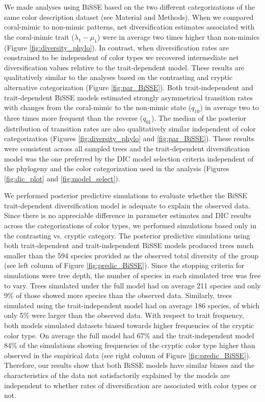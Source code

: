 We made analyses using BiSSE based on the two different categorizations of the same color description dataset (see Material and Methods). When we compared coral-mimic to non-mimic patterns, net diversification estimates associated with the coral-mimic trait ($\lambda_{1} - \mu_{1}$) were in average two times higher than non-mimics (Figure \ref{fig:diversity_phylo}). In contrast, when diversification rates are constrained to be independent of color types we recovered intermediate net diversification values relative to the trait-dependent model. These results are qualitatively similar to the analyses based on the contrasting and cryptic alternative categorization (Figure \ref{fig:par_BiSSE}). Both trait-independent and trait-dependent BiSSE models estimated strongly asymmetrical transition rates with changes from the coral-mimic to the non-mimic state ($q_{10}$) in average two to three times more frequent than the reverse ($q_{01}$). The median of the posterior distribution of transition rates are also qualitatively similar independent of color categorization (Figures \ref{fig:diversity_phylo} and \ref{fig:par_BiSSE}). These results were consistent across all sampled trees and the trait-dependent diversification model was the one preferred by the DIC model selection criteria independent of the phylogeny and the color categorization used in the analysis (Figures \ref{fig:dic_plot} and \ref{fig:model_select}).

We performed posterior predictive simulations to evaluate whether the BiSSE trait-dependent diversification model is adequate to explain the observed data. Since there is no appreciable difference in parameter estimates and DIC results across the categorizations of color types, we performed simulations based only in the contrasting vs. cryptic category. The posterior predictive simulations using both trait-dependent and trait-independent BiSSE models produced trees much smaller than the 594 species provided as the observed total diversity of the group (see left column of Figure \ref{fig:predic_BiSSE}). Since the stopping criteria for simulations were tree depth, the number of species in each simulated tree was free to vary. Trees simulated under the full model had on average 211 species and only 9\% of those showed more species than the observed data. Similarly, trees simulated using the trait-independent model had on average 186 species, of which only 5\% were larger than the observed data. With respect to trait frequency, both models simulated datasets biased towards higher frequencies of the cryptic color type. On average the full model had 67\% and the trait-independent model 84\% of the simulations showing frequencies of the cryptic color type higher than observed in the empirical data (see right column of Figure \ref{fig:predic_BiSSE}). Therefore, our results show that both BiSSE models have similar biases and the characteristics of the data not satisfactorily explained by the models are independent to whether rates of diversification are associated with color types or not.

